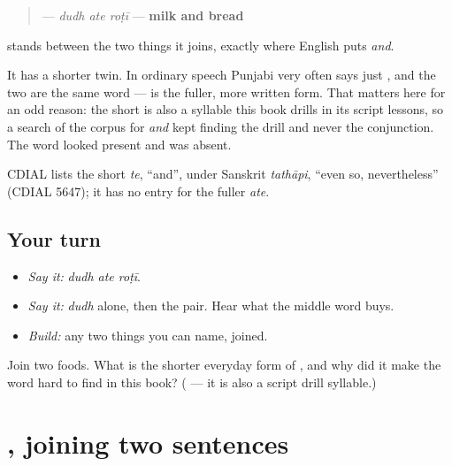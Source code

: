 \begin{cousinweb}
\begin{quote}
\textbf{  } — \emph{dudh ate roṭī} — \textbf{milk and bread}
\end{quote}

\textbf{} stands between the two things it joins, exactly where English puts \emph{and}.

It has a shorter twin. In ordinary speech Punjabi very often says just \textbf{}, and the two are the same word — \textbf{} is the fuller, more written form. That matters here for an odd reason: the short \textbf{} is also a syllable this book drills in its script lessons, so a search of the corpus for \emph{and} kept finding the drill and never the conjunction. The word looked present and was absent.

CDIAL lists the short \emph{te}, \textquotedblleft{}and\textquotedblright{}, under Sanskrit \emph{tathāpi}, \textquotedblleft{}even so, nevertheless\textquotedblright{} (CDIAL 5647); it has no entry for the fuller \emph{ate}.
\end{cousinweb}

\subsection*{Your turn}
\begin{itemize}
\raggedright
  \item \emph{Say it:} \emph{dudh ate roṭī}.
  \item \emph{Say it:} \emph{dudh} alone, then the pair. Hear what the middle word buys.
  \item \emph{Build:} any two things you can name, joined.
\end{itemize}

\begin{tcolorbox}[breakable,colback=teal!4,colframe=teal!35!black,title={Before you move on}]
Join two foods. What is the shorter everyday form of \textbf{}, and why did it make the word hard to find in this book? (\textbf{} — it is also a script drill syllable.)
\end{tcolorbox}
\section[\texorpdfstring{… \pa{ਅਤੇ} … (… ate …)}{… ਅਤੇ … (… ate …)}]{, joining two sentences}

\label{lesson:PA-C38-ate-vaak}



